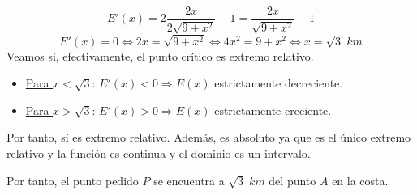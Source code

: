 \begin{ejercicio}
    \begin{equation*}
        E'(x) = 2\frac{2x}{2\sqrt{9+x^2}} - 1 = \frac{2x}{\sqrt{9+x^2}} - 1
    \end{equation*}
    \begin{equation*}
        E'(x)= 0 \Longleftrightarrow 2x=\sqrt{9+x^2} \Longleftrightarrow 4x^2 = 9+x^2 \Longleftrightarrow x=\sqrt{3}\;km
    \end{equation*}
    Veamos si, efectivamente, el punto crítico es extremo relativo.
    \begin{itemize}
        \item \underline{Para $x<\sqrt{3}$}: $E'(x) < 0 \Longrightarrow E(x)$ estrictamente decreciente.
        \item \underline{Para $x>\sqrt{3}$}: $E'(x) > 0 \Longrightarrow E(x)$ estrictamente creciente.
    \end{itemize}

    Por tanto, sí es extremo relativo. Además, es absoluto ya que es el único extremo relativo y la función es continua y el dominio es un intervalo.
    
    Por tanto, el punto pedido $P$ se encuentra a $\sqrt{3}\;km$ del punto $A$ en la costa.
\end{ejercicio}

